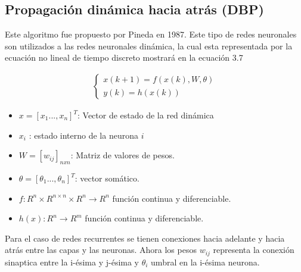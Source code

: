 \subsection{Propagación dinámica hacia atrás (DBP)}
Este algoritmo fue propuesto por Pineda\cite{PINEDA} en 1987. Este tipo de redes neuronales son utilizados a las redes neuronales dinámica, la cual esta representada por la ecuación no lineal de tiempo discreto mostrará en la ecuación 3.7


\begin{equation}
\label{ECUATION}
\begin{aligned}
\left\lbrace
\begin{array}{ll}
x(k+1)=f(x(k),W,\theta) \\
y(k)= h(x(k))
\end{array}
\right.
\end{aligned}
\end{equation}

\begin{itemize}
	\item $x=[x_{1}...,x_{n}]^{T}$: Vector de estado de la red dinámica
	\item  $x_{i}$ : estado interno de la neurona $i$
	\item  $W=[w_{ij}]_{nxn}$: Matriz de valores de pesos.
	\item $\theta=[\theta_{1}...,\theta_{n}]^{T}$: vector somático.
	\item $f:R^{n}\times R^{n\times n}\times R^{n} \rightarrow R^{n}$ función continua y diferenciable.
	\item $h(x):R^{n} \rightarrow R^{m}$ función continua y diferenciable. 	
\end{itemize}



Para el caso de redes recurrentes se tienen conexiones hacia adelante y hacia atrás entre las capas y las neuronas. Ahora los pesos $w_{ij}$ representa la conexión sinaptica entre la i-ésima  y j-ésima y $\theta_{i}$ umbral en la i-ésima neurona.


